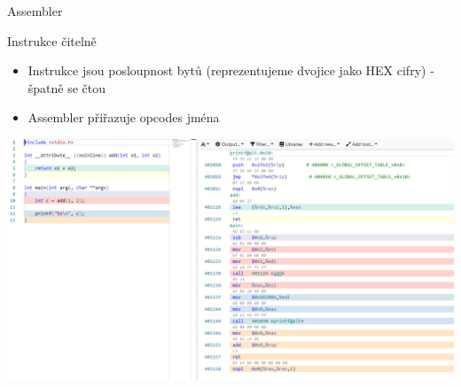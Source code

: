 \documentclass[9pt]{beamer}
\begin{document}
\begin{frame}{Assembler}
    \begin{block}{Instrukce čitelně}
        \begin{itemize}
            \item Instrukce jsou posloupnost bytů (reprezentujeme dvojice jako HEX cifry) - špatně se čtou
            \item Assembler přiřazuje opcodes jména
        \end{itemize}
    \end{block}

    \begin{center}
        \includegraphics[width=0.9\linewidth]{lekce19/assembler.png}
    \end{center}
\end{frame}
\end{document}
